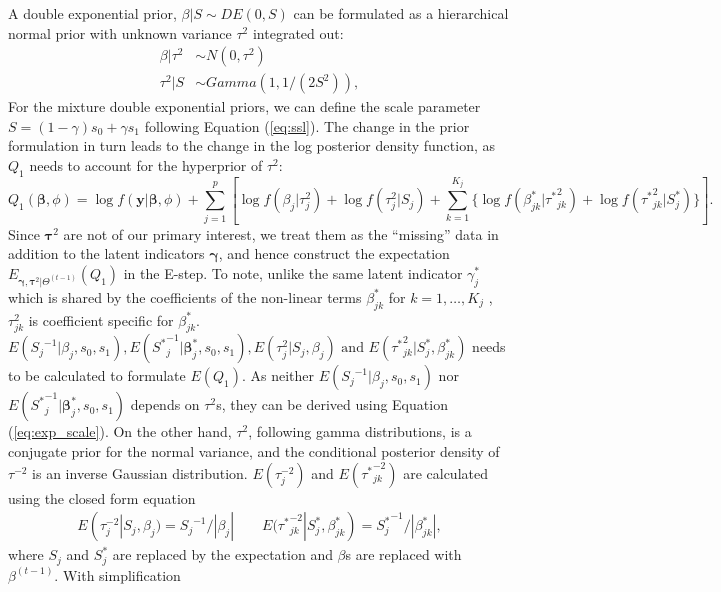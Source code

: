\documentclass[
]{article}
\begin{document}
A double exponential prior, \(\beta|S \sim DE(0, S)\) can be formulated
as a hierarchical normal prior with unknown variance \(\tau^2\)
integrated out: \begin{align*}
  \beta|\tau^2 &\sim N(0, \tau^2)\\
  \tau^2|S & \sim Gamma(1, 1/(2S^2)), 
\end{align*} For the mixture double exponential priors, we can define
the scale parameter \(S = (1-\gamma)s_0 + \gamma s_1\) following
Equation (\ref{eq:ssl}). The change in the prior formulation in turn
leads to the change in the log posterior density function, as \(Q_1\)
needs to account for the hyperprior of \(\tau^2\):
\begin{equation}\label{eq:Q1_IWLS}
Q_1(\boldsymbol{\beta}, \phi) = \log f(\textbf{y}|\boldsymbol{\beta}, \phi) + \sum\limits_{j=1}^p\left[\log f(\beta_j|{\tau}^2_j) + \log f({\tau}^2_j| S_j)+\sum\limits_{k=1}^{K_j} \{\log f(\beta^{*}_{jk}|{\tau^{*}}^2_{jk})+\log f({\tau^*}^2_{jk}| S^*_j)\}\right].
\end{equation} Since \(\boldsymbol{\tau}^2\) are not of our primary
interest, we treat them as the ``missing'' data in addition to the
latent indicators \(\boldsymbol{\gamma}\), and hence construct the
expectation
\(E_{\boldsymbol{\gamma}, \boldsymbol{\tau}^2|\Theta^{(t-1)}}(Q_1)\) in
the E-step. To note, unlike the same latent indicator \(\gamma^*_j\)
which is shared by the coefficients of the non-linear terms
\(\beta^*_{jk}\) for \(k = 1, \dots, K_j\) , \(\tau^2_{jk}\) is
coefficient specific for \(\beta^*_{jk}\).
\(E({S_j}^{-1}|\beta_j, s_0, s_1), E({S^*}^{-1}_j|\boldsymbol{\beta}_j^*, s_0, s_1), E({\tau}^2_{j}|S_j, \beta_j) \text{ and } E({\tau^*}^2_{jk}|S_j^*, \beta^*_{jk})\)
needs to be calculated to formulate \(E(Q_1)\). As neither
\(E({S_j}^{-1}|\beta_j, s_0, s_1)\) nor
\(E({S^*}^{-1}_j|\boldsymbol{\beta}_j^*, s_0, s_1)\) depends on
\(\tau^2\)s, they can be derived using Equation (\ref{eq:exp_scale}). On
the other hand, \(\tau^{2}\), following gamma distributions, is a
conjugate prior for the normal variance, and the conditional posterior
density of \(\tau^{-2}\) is an inverse Gaussian distribution.
\(E({\tau}^{-2}_{j})\) and \(E({\tau^*}^{-2}_{jk})\) are calculated
using the closed form equation \begin{align*}
 E({\tau}^{-2}_{j}|S_j, \beta_j) ={S_j}^{-1}/|\beta_j| \qquad E({\tau^*}^{-2}_{jk}|S_j^*, \beta^*_{jk})={S_j^*}^{-1}/|\beta^*_{jk}|,
\end{align*} where \(S_j\) and \(S_j^*\) are replaced by the expectation
and \(\beta\)s are replaced with \(\beta^{(t-1)}\). With simplification
\end{document}
